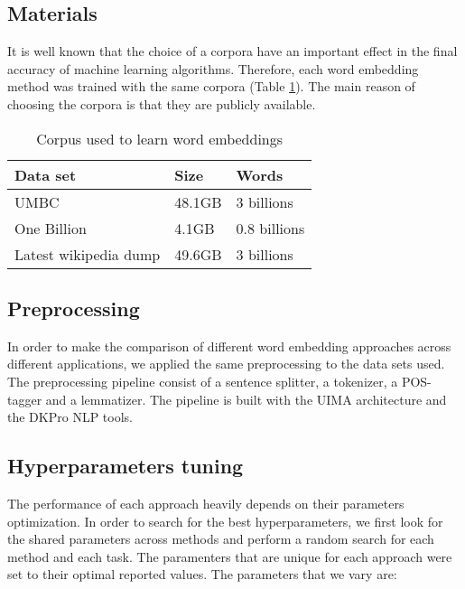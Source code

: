 \documentclass[11pt]{article}
\begin{document}
\subsection{Materials}
It is well known that the choice of a corpora have an important effect in the final accuracy of machine learning algorithms. 
Therefore, each word embedding method was trained with the same corpora (Table \ref{corpus}). The main reason of choosing the corpora 
is that they are publicly available. 

\begin{table}[h]
\begin{center}
\begin{small}
\begin{tabular}{lll}
\hline
\textbf{Data set} & \textbf{Size} & \textbf{Words} \\ \hline
UMBC 	& 48.1GB & 3 billions \\
One Billion 	& 4.1GB & 0.8 billions  \\
Latest wikipedia dump & 49.6GB & 3 billions \\
\end{tabular}
\end{small}
\label{corpus}
\caption{Corpus used to learn word embeddings}
\end{center}
\end{table}

\subsection{Preprocessing}

In order to make the comparison of different word embedding approaches across different applications, we applied the same preprocessing to the data sets used. 
The preprocessing pipeline consist of a sentence splitter, a tokenizer, a POS-tagger and a lemmatizer. The pipeline is built with the UIMA architecture and the DKPro NLP tools. 


\subsection{Hyperparameters tuning}

The performance of each approach heavily depends on their parameters optimization.
In order to search for the best hyperparameters, we first
look for the shared parameters across methods and perform a random search 
for each method and each task.
The paramenters that are unique for each approach were set to their optimal 
reported values. The parameters that we vary are:
\end{document}
